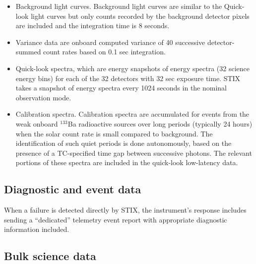 \documentclass{aa}
\begin{document}
\begin{itemize}
\item Background light curves. Background light curves are similar to the Quick-look light curves but only
counts recorded by the background detector pixels are included and the integration time is 8 seconds.
\item Variance data are   onboard computed variance of 40 successive detector-summed count rates
based on 0.1 sec integration.
\item Quick-look spectra, which are energy snapshots of energy spectra (32 science energy bins) for
each of the 32 detectors with 32 sec exposure time.
STIX takes a snapshot of energy spectra every 1024
seconds in the nominal observation mode.
\item Calibration spectra. Calibration spectra are accumulated for events from the weak onboard $^{133}$Ba radioactive sources over long periods (typically 24 hours) when the solar count rate is small compared to background.
The identification of such quiet periods is done autonomously, based on the presence of a
TC-specified time gap between successive photons.  The relevant portions of these
spectra are included in the quick-look low-latency data.
\end{itemize}
\subsection{Diagnostic and event data}
When a failure is detected directly by STIX, the instrument’s response includes sending a
“dedicated” telemetry event report with appropriate diagnostic information included.

\subsection{Bulk science data}
\end{document}
